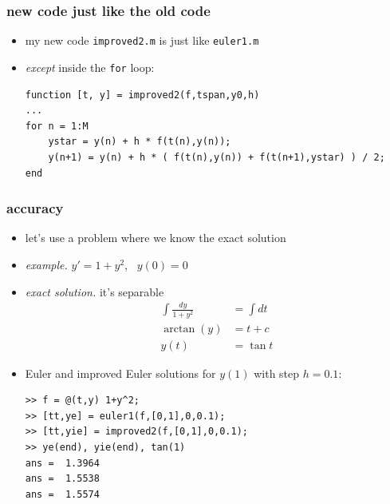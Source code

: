 \documentclass[urlcolor=blue,dvipsnames]{beamer}
\begin{document}
\begin{frame}[fragile]
\frametitle{new code just like the old code}

\begin{itemize}
\item my new code \texttt{improved2.m} is just like \texttt{euler1.m}
\item \emph{except} inside the \texttt{for} loop:

\bigskip
{\color{Green}
\begin{Verbatim}[fontsize=\footnotesize]
function [t, y] = improved2(f,tspan,y0,h)
...
for n = 1:M
    ystar = y(n) + h * f(t(n),y(n));
    y(n+1) = y(n) + h * ( f(t(n),y(n)) + f(t(n+1),ystar) ) / 2;
end
\end{Verbatim}
}
\end{itemize}
\end{frame}


\begin{frame}[fragile]
\frametitle{accuracy}

\begin{itemize}
\item let's use a problem where we know the exact solution
\item \emph{example.}  $y' = 1+y^2$, \, $y(0)=0$
\item \emph{exact solution.} it's separable
\footnotesize
\begin{align*}
\int \frac{dy}{1+y^2} &= \int dt \\
\arctan(y) &= t+c \\
y(t) &= \tan t
\end{align*}
\normalsize
\item Euler and improved Euler solutions for $y(1)$ with step $h=0.1$:
\begin{Verbatim}[fontsize=\small]
>> f = @(t,y) 1+y^2;
>> [tt,ye] = euler1(f,[0,1],0,0.1);
>> [tt,yie] = improved2(f,[0,1],0,0.1);
>> ye(end), yie(end), tan(1)
ans =  1.3964
ans =  1.5538
ans =  1.5574
\end{Verbatim}
\end{itemize}
\end{frame}
\end{document}
